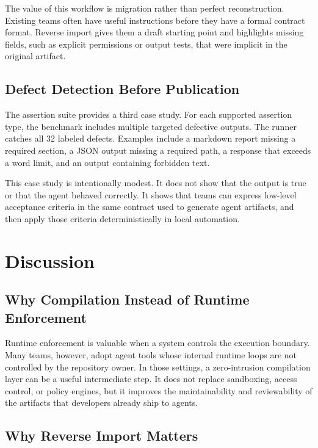 \documentclass[11pt]{article}
\begin{document}
The value of this workflow is migration rather than perfect reconstruction.
Existing teams often have useful instructions before they have a formal contract
format. Reverse import gives them a draft starting point and highlights missing
fields, such as explicit permissions or output tests, that were implicit in the
original artifact.

\subsection{Defect Detection Before Publication}

The assertion suite provides a third case study. For each supported assertion type,
the benchmark includes multiple targeted defective outputs. The runner catches all 32
labeled defects. Examples include a markdown report missing a required section, a
JSON output missing a required path, a response that exceeds a word limit, and an
output containing forbidden text.

This case study is intentionally modest. It does not show that the output is true or
that the agent behaved correctly. It shows that teams can express low-level
acceptance criteria in the same contract used to generate agent artifacts, and then
apply those criteria deterministically in local automation.

\section{Discussion}

\subsection{Why Compilation Instead of Runtime Enforcement}

Runtime enforcement is valuable when a system controls the execution boundary. Many
teams, however, adopt agent tools whose internal runtime loops are not controlled by
the repository owner. In those settings, a zero-intrusion compilation layer can be a
useful intermediate step. It does not replace sandboxing, access control, or policy
engines, but it improves the maintainability and reviewability of the artifacts that
developers already ship to agents.

\subsection{Why Reverse Import Matters}
\end{document}

